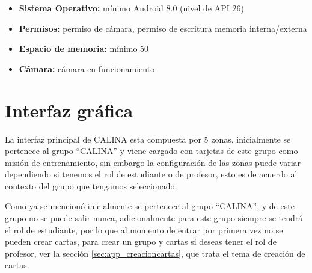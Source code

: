 \begin{itemize}
	\item \textbf{Sistema Operativo:} mínimo Android 8.0 (nivel de API 26)
	\item \textbf{Permisos:} permiso de cámara, permiso de escritura memoria interna/externa
	\item \textbf{Espacio de memoria:} mínimo \qty{50}{\mega\byte}
	\item \textbf{Cámara:} cámara en funcionamiento
\end{itemize}

\section{Interfaz gráfica}

La interfaz principal de CALINA esta compuesta por 5 zonas, inicialmente se pertenece al grupo ``CALINA'' y 
viene cargado con tarjetas de este grupo como misión de entrenamiento, sin embargo la configuración de las 
zonas puede variar dependiendo si tenemos el rol de estudiante o de profesor, esto es de acuerdo al contexto 
del grupo que tengamos seleccionado.

Como ya se mencionó inicialmente se pertenece al grupo ``CALINA'', y de este grupo no se puede salir nunca, 
adicionalmente para este grupo siempre se tendrá el rol de estudiante, por lo que al momento de entrar por 
primera vez no se pueden crear cartas, para crear un grupo y cartas si deseas tener el rol de profesor, ver la 
sección \ref{sec:app_creacioncartas}, que trata el tema de creación de cartas.


